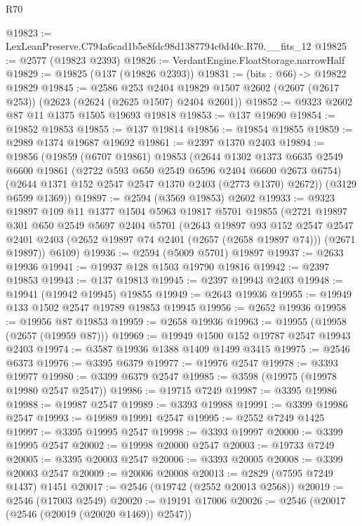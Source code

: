 \begin{lexlean}{R70}
\begin{coremodule}
@19823 := LexLeanPreserve.C794a6cad1b5e8fdc98d1387794c0d40c.R70.__fits_12
@19825 := @2577 (@19823 @2393)
@19826 := VerdantEngine.FloatStorage.narrowHalf
@19829 := @19825 (@137 (@19826 @2393))
@19831 := (bits : @66) -> @19822 @19829
@19845 := @2586
    @253
    @2404
    @19829
    @1507
    @2602
    (@2607 (@2617 @253))
    (@2623 (@2624 (@2625 @1507) @2404 @2601))
@19852 := @9323 @2602 @87 @11 @1375 @1505 @19693 @19818
@19853 := @137 @19690
@19854 := @19852 @19853
@19855 := @137 @19814
@19856 := @19854 @19855
@19859 := @2989 @1374 @19687 @19692
@19861 := @2397 @1370 @2403
@19894 := @19856
    (@19859
      (@6707 @19861)
      @19853
      (@2644
        @1302
        @1373
        @6635
        @2549
        @6600
        @19861
        (@2722 @593 @650 @2549 @6596 @2404 @6600 @2673 @6754)
        (@2644 @1371 @152 @2547 @2547 @1370 @2403 (@2773 @1370) @2672))
      (@3129 @6599 @1369))
@19897 := @2594 (@3569 @19853) @2602
@19933 := @9323
    @19897
    @109
    @11
    @1377
    @1504
    @5963
    @19817
    @5701
    @19855
    (@2721
      @19897
      @301
      @650
      @2549
      @5697
      @2404
      @5701
      (@2643
        @19897
        @93
        @152
        @2547
        @2547
        @2401
        @2403
        (@2652 @19897 @74 @2401 (@2657 (@2658 @19897 @74)))
        (@2671 @19897))
      @6109)
@19936 := @2594 (@5009 @5701) @19897
@19937 := @2633 @19936
@19941 := @19937 @128 @1503 @19790 @19816
@19942 := @2397 @19853
@19943 := @137 @19813
@19945 := @2397 @19943 @2403
@19948 := @19941 (@19942 @19945) @19855
@19949 := @2643 @19936
@19955 := @19949 @133 @1502 @2547 @19789 @19853 @19945
@19956 := @2652 @19936
@19958 := @19956 @87 @19853
@19959 := @2658 @19936
@19963 := @19955 (@19958 (@2657 (@19959 @87)))
@19969 := @19949 @1500 @152 @19787 @2547 @19943 @2403
@19974 := @3587 @19936 @1388 @1409 @1499 @3415
@19975 := @2546 @6373
@19976 := @3395 @6379
@19977 := @19976 @2547
@19978 := @3393 @19977
@19980 := @3399 @6379 @2547
@19985 := @3598 (@19975 (@19978 @19980 @2547 @2547))
@19986 := @19715 @7249
@19987 := @3395 @19986
@19988 := @19987 @2547
@19989 := @3393 @19988
@19991 := @3399 @19986 @2547
@19993 := @19989 @19991 @2547
@19995 := @2552 @7249 @1425
@19997 := @3395 @19995 @2547
@19998 := @3393 @19997
@20000 := @3399 @19995 @2547
@20002 := @19998 @20000 @2547
@20003 := @19733 @7249
@20005 := @3395 @20003 @2547
@20006 := @3393 @20005
@20008 := @3399 @20003 @2547
@20009 := @20006 @20008
@20013 := @2829 (@7595 @7249 @1437) @1451
@20017 := @2546 (@19742 (@2552 @20013 @2568))
@20019 := @2546 (@17003 @2549)
@20020 := @19191 @17006
@20026 := @2546 (@20017 (@2546 (@20019 (@20020 @1469)) @2547))

\end{coremodule}
\end{lexlean}
